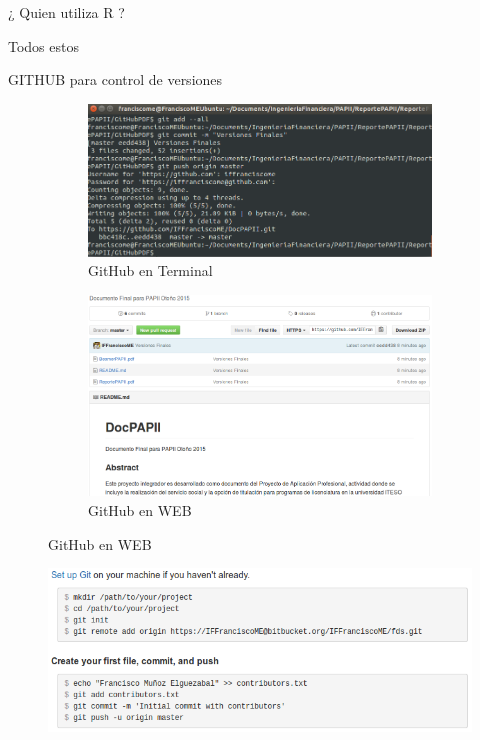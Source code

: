 \documentclass{IFFranciscoME}\usepackage[]{graphicx}\usepackage[]{color}
\begin{document}
\begin{frame}{¿ Quien utiliza R ?}


Todos estos

\end{frame}


\begin{frame}{GITHUB para control de versiones}

\begin{figure}
\centering
\begin{subfigure}{.5\textwidth}
  \centering
  \includegraphics[width=1.1\linewidth]{figure/GitHubLINUX.png}
  \caption{GitHub en Terminal}
\end{subfigure}%
\begin{subfigure}{.5\textwidth}
  \centering
  \includegraphics[width=.85\linewidth]{figure/GitHubWEB.png}
  \caption{GitHub en WEB}
\end{subfigure}
\end{figure}

\begin{figure}[H]
\centering
\includegraphics[scale=.34]{figure/SetupGit.png}
\end{figure}

\end{frame}
\end{document}
